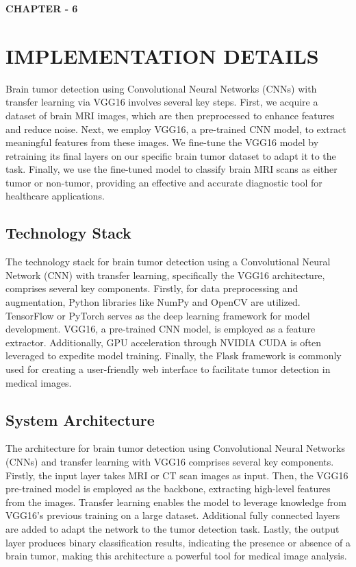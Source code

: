 \newpage
\begin{center}
    \textbf{\LARGE CHAPTER - 6}
\end{center}
\section{IMPLEMENTATION DETAILS}

 Brain tumor detection using Convolutional Neural Networks (CNNs) with transfer learning via VGG16 involves several key steps. First, we acquire a dataset of brain MRI images, which are then preprocessed to enhance features and reduce noise. Next, we employ VGG16, a pre-trained CNN model, to extract meaningful features from these images. We fine-tune the VGG16 model by retraining its final layers on our specific brain tumor dataset to adapt it to the task. Finally, we use the fine-tuned model to classify brain MRI scans as either tumor or non-tumor, providing an effective and accurate diagnostic tool for healthcare applications.



\subsection{Technology Stack}

The technology stack for brain tumor detection using a Convolutional Neural Network (CNN) with transfer learning, specifically the VGG16 architecture, comprises several key components. Firstly, for data preprocessing and augmentation, Python libraries like NumPy and OpenCV are utilized. TensorFlow or PyTorch serves as the deep learning framework for model development. VGG16, a pre-trained CNN model, is employed as a feature extractor. Additionally, GPU acceleration through NVIDIA CUDA is often leveraged to expedite model training. Finally, the Flask framework is commonly used for creating a user-friendly web interface to facilitate tumor detection in medical images.

\subsection{System Architecture}
The architecture for brain tumor detection using Convolutional Neural Networks (CNNs) and transfer learning with VGG16 comprises several key components. Firstly, the input layer takes MRI or CT scan images as input. Then, the VGG16 pre-trained model is employed as the backbone, extracting high-level features from the images. Transfer learning enables the model to leverage knowledge from VGG16's previous training on a large dataset. Additional fully connected layers are added to adapt the network to the tumor detection task. Lastly, the output layer produces binary classification results, indicating the presence or absence of a brain tumor, making this architecture a powerful tool for medical image analysis.



